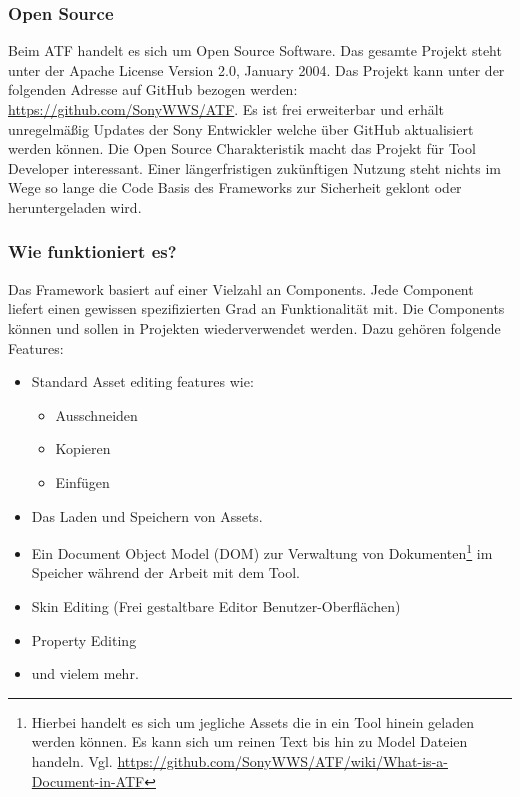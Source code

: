 \documentclass[pagesize, paper=a4, fontsize=12pt, titlepage=true, headings=small, headnosepline, abstractoff, liststotoc, nochapterprefix, plainheadsepline, twoside]{scrreprt}
\begin{document}
\subsubsection{Open Source}
Beim ATF handelt es sich um Open Source Software. Das gesamte Projekt steht unter der Apache License Version 2.0, January 2004. Das Projekt kann unter der folgenden Adresse auf GitHub bezogen werden: \url{https://github.com/SonyWWS/ATF}. Es ist frei erweiterbar und erhält unregelmäßig Updates der Sony Entwickler welche über GitHub aktualisiert werden können. Die Open Source Charakteristik macht das Projekt für Tool Developer interessant. Einer längerfristigen zukünftigen Nutzung steht nichts im Wege so lange die Code Basis des Frameworks zur Sicherheit geklont oder heruntergeladen wird. 

\subsubsection{Wie funktioniert es?}
Das Framework basiert auf einer Vielzahl an Components. Jede Component liefert einen gewissen spezifizierten Grad an Funktionalität mit. Die Components können und sollen in Projekten wiederverwendet werden. Dazu gehören folgende Features:

\begin{itemize}
\item Standard Asset editing features wie:

	\begin{itemize}
	\item Ausschneiden
	\item Kopieren
	\item Einfügen
	\end{itemize}

\item Das Laden und Speichern von Assets.
\item Ein Document Object Model (DOM) zur Verwaltung von Dokumenten\footnote{Hierbei handelt es sich um jegliche Assets die in ein Tool hinein geladen werden können. Es kann sich um reinen Text bis hin zu Model Dateien handeln. Vgl. \url{https://github.com/SonyWWS/ATF/wiki/What-is-a-Document-in-ATF}} im Speicher während der Arbeit mit dem Tool.
\item Skin Editing (Frei gestaltbare Editor Benutzer-Oberflächen)
\item Property Editing
\item und vielem mehr.
\end{itemize}
\end{document}

